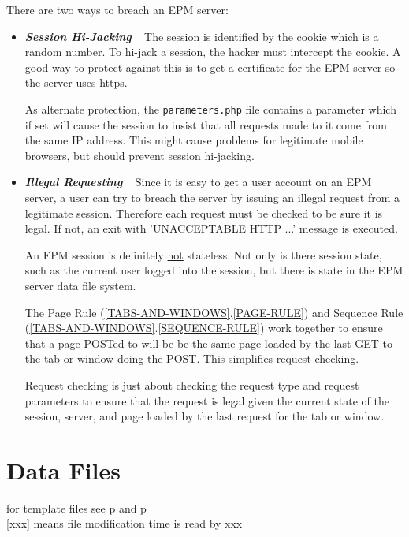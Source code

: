 \documentclass[12pt]{article}
\newcommand{\key}[1]{{\bf \em #1}}
\newcommand{\pagref}[1]{p\pageref{#1}}
\newcommand{\sref}[2]{(\ref{#1}.\ref{#2})}
\begin{document}
There are two ways to breach an EPM server:

\begin{itemize}

\item \key{Session Hi-Jacking} ~ The session is identified
by the cookie which is a random number.  To hi-jack a session,
the hacker must intercept the cookie.  A good way to 
protect against this is to get a certificate for the EPM
server so the server uses https.

As alternate protection, the {\tt parameters.php} file
contains a parameter which if set will cause the session
to insist that all requests made to it come from the same
IP address.  This might cause problems for legitimate mobile browsers,
but should prevent session hi-jacking.

\item \key{Illegal Requesting} ~ Since it is easy to get a user
account on an EPM server, a user can try to breach the server by issuing
an illegal request from a legitimate session.  Therefore each
request must be checked to be sure it is legal.  If not,
an exit with 'UNACCEPTABLE HTTP ...' message is executed.

An EPM session is definitely \underline{not} stateless.
Not only is there session state, such as the current
user logged into the session, but there is state in the
EPM server data file system.

The Page Rule \sref{TABS-AND-WINDOWS}{PAGE-RULE}
and Sequence Rule \sref{TABS-AND-WINDOWS}{SEQUENCE-RULE}
work together to ensure that a page POSTed to will be
be the same page loaded by the last GET to the tab or
window doing the POST.  This simplifies request checking.

Request checking is just about checking the request type and
request parameters to ensure that the request is legal given the
current state of the session, server, and page loaded by the
last request for the tab or window.

\end{itemize}

\newpage

\section{Data Files}

for template files see \pagref{JOB-TEMPLATES} and \pagref{TEMPLATE.OPTN}
\\{}
[xxx] means file modification time is read by xxx
\end{document}
